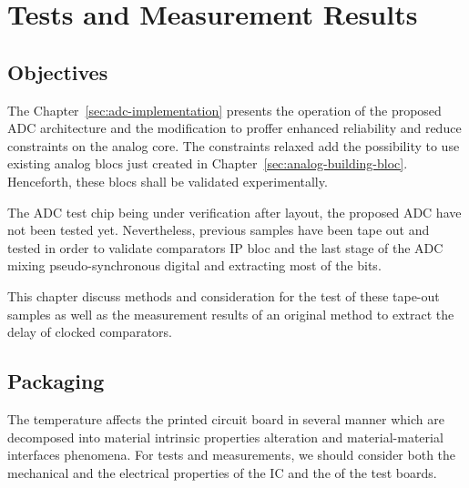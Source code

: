 \chapter{Tests and Measurement Results}
\label{sec:tests-meas}
\ifpdf
    \graphicspath{{Chapter5/Figs/Raster/}{Chapter5/Figs/PDF/}{Chapter5/Figs/}}
\else
    \graphicspath{{Chapter5/Figs/Vector/}{Chapter5/Figs/}}
\fi 

\section{Objectives}
The Chapter~\ref{sec:adc-implementation} presents the operation of the proposed ADC architecture and the modification to proffer enhanced reliability and reduce constraints on the analog core. The constraints relaxed add the possibility to use existing analog blocs just created in Chapter~\ref{sec:analog-building-bloc}. Henceforth, these blocs shall be validated experimentally.

The ADC test chip being under verification after layout, the proposed ADC have not been tested yet. Nevertheless, previous samples have been tape out and tested in order to validate comparators IP bloc and the last stage of the ADC mixing pseudo-synchronous digital and extracting most of the bits.

This chapter discuss methods and consideration for the test of these tape-out samples as well as the measurement results of an original method to extract the delay of clocked comparators.

\section{Packaging}           %

The temperature affects the printed circuit board in several manner which are decomposed into material intrinsic properties alteration and material-material interfaces phenomena. For tests and measurements, we should consider both the mechanical and the electrical properties of the IC and the of the test boards.

